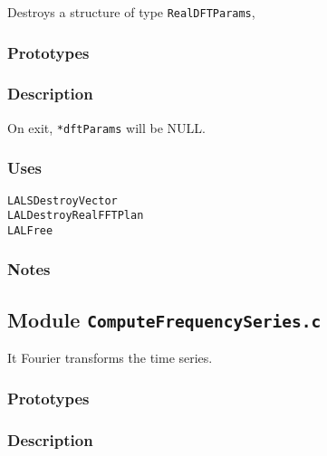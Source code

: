 Destroys a structure of type \verb+RealDFTParams+,

\subsubsection*{Prototypes}
\vspace{0.1in}
%

\subsubsection*{Description}

On exit, \verb+*dftParams+ will be NULL.

\subsubsection*{Uses}
\begin{verbatim}
LALSDestroyVector
LALDestroyRealFFTPlan
LALFree
\end{verbatim}

\subsubsection*{Notes}


\newpage
\subsection{Module \texttt{ComputeFrequencySeries.c}}
\label{ss:ComputeFrequencySeries.c}

It Fourier transforms the time series.

\subsubsection*{Prototypes}
\vspace{0.1in}


\subsubsection*{Description}

